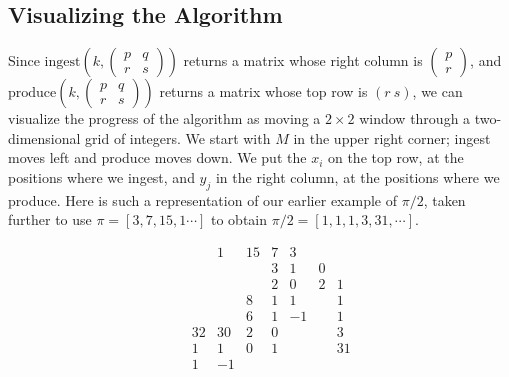 \documentclass[11pt, oneside]{amsart}   	%
\newcommand{\pqrs}{\left(
\begin{smallmatrix} 
p & q\\ 
r & s 
\end{smallmatrix}
\right)}
\renewcommand{\:}{\negthickspace:\negthickspace}
\begin{document}
\subsection{Visualizing the Algorithm}
Since $\mbox{ingest}(k,\pqrs)$ returns a matrix whose right column is
$\left( \begin{smallmatrix} p \\  r \end{smallmatrix}\right)$,
and $\mbox{produce}(k,\pqrs)$ returns a matrix whose top row is $(r\ s)$, we can visualize the progress of the algorithm
as moving a $2 \times 2$ window through a two-dimensional grid of integers.
We start with $M$ in the upper right corner; ingest moves left and produce moves down.
We put the $x_i$ on the top row, at the positions where we ingest, and $y_j$ in the right column, at the positions where we produce.
Here is such a representation of our earlier example of $\pi/2$, taken further to use $\pi = [3,7,15, 1\cdots]$ to obtain $\pi/2 = [1,1,1,3,31,\cdots]$.

\begin{equation*}\label{eq:2dgrid}
\begin{matrix}
 & & & 1& 15&       7&  3& &\\
 & & &  &        &     3&   1& 0&\\
 & & &  &        &     2&    0& 2& 1\\
 & & &  &        8&   1&    1&   &  1\\
 & & &  &        6&   1&    -1&  & 1\\
 & & 32& 30&  2& 0&        &  &  3\\
 & &  1&   1&  0&  1&        &  & 31\\
 & &   1&  -1&   &    &        &  &
\end{matrix}
\end{equation*}
\end{document}
